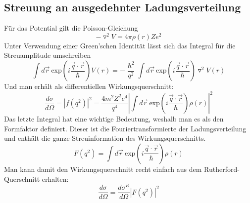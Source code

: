 \documentclass[Ex4_Zusammenfassung.tex]{subfiles}
\begin{document}
\subsection{Streuung an ausgedehnter Ladungsverteilung}
Für das Potential gilt die Poisson-Gleichung
\begin{equation}
- \triangledown^2 V = 4 \pi \rho(r) Ze^2
\end{equation}
Unter Verwendung einer Green'schen Identität lässt sich das Integral für die Streuamplitude umschreiben 
\begin{equation}
\int d \vec r \  \text{exp} \left(i \frac{ \vec q \cdot \vec r }{\hslash} \right) V(r) = - \frac{\hslash^2}{q^2} \int d \vec r \  \text{exp} \left(i \frac{\vec q \cdot \vec r }{\hslash}\right) \triangledown^2 V(r)
\end{equation}
Und man erhält als differentiellen Wirkungsquerschnitt:
\begin{equation}
\frac{d\sigma}{d\Omega} = |f(q^2)|^2 = \frac{4m^2Z^2e^4}{q^4} \left|\int d \vec r \  \text{exp}\left(i \frac{ \vec q \cdot \vec r }{\hslash} \right) \rho(r)  \right|^2
\end{equation}
Das letzte Integral hat eine wichtige Bedeutung, weshalb man es als den Formfaktor definiert. Dieser ist die Fouriertransformierte der Ladungsverteilung und enthält die ganze Streuinformation des Wirkungsquerschnitts.
\begin{equation}
F(q^2) = \int d \vec r \   \text{exp}\left(i \frac{ \vec q \cdot \vec r }{\hslash} \right) \rho(r)
\end{equation}
Man kann damit den Wirkungsquerschnitt recht einfach aus dem Rutherford-Querschnitt erhalten:
\begin{equation}
\frac{d\sigma}{d\Omega} = \frac{d\sigma^R}{d\Omega} |F(q^2)|^2
\end{equation}
\end{document}
